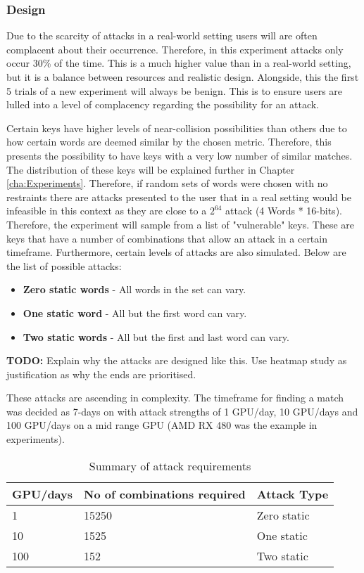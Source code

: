 \subsubsection{Design}

Due to the scarcity of attacks in a real-world setting users will are often complacent about their occurrence. Therefore, in this experiment attacks only occur 30\% of the time. This is a much higher value than in a real-world setting, but it is a balance between resources and realistic design. Alongside, this the first 5 trials of a new experiment will always be benign. This is to ensure users are lulled into a level of complacency regarding the possibility for an attack.

Certain keys have higher levels of near-collision possibilities than others due to how certain words are deemed similar by the chosen metric. Therefore, this presents the possibility to have keys with a very low number of similar matches. The distribution of these keys will be explained further in Chapter \ref{cha:Experiments}. Therefore, if random sets of words were chosen with no restraints there are attacks presented to the user that in a real setting would be infeasible in this context as they are close to a $2^{64}$ attack (4 Words * 16-bits). Therefore, the experiment will sample from a list of "vulnerable" keys. These are keys that have a number of combinations that allow an attack in a certain timeframe. Furthermore, certain levels of attacks are also simulated. Below are the list of possible attacks:

\begin{itemize}
    \item \textbf{Zero static words} - All words in the set can vary.
    \item \textbf{One static word} - All but the first word can vary.
    \item \textbf{Two static words} - All but the first and last word can vary.
\end{itemize}

\textbf{TODO: } Explain why the attacks are designed like this. Use heatmap study as justification as why the ends are prioritised.

These attacks are ascending in complexity. The timeframe for finding a match was decided as 7-days on with attack strengths of 1 GPU/day, 10 GPU/days and 100 GPU/days on a mid range GPU (AMD RX 480 was the example in experiments). 

\begin{table}[h!]
    \centering
    \begin{tabular}{lll}
        GPU/days & No of combinations required & Attack Type \\
        \hline
        1       & 15250   & Zero static\\
        10      & 1525    & One static\\
        100     & 152     & Two static\\        
    \end{tabular}
    \caption{Summary of attack requirements}
    \label{tab:attackReq}
\end{table}

